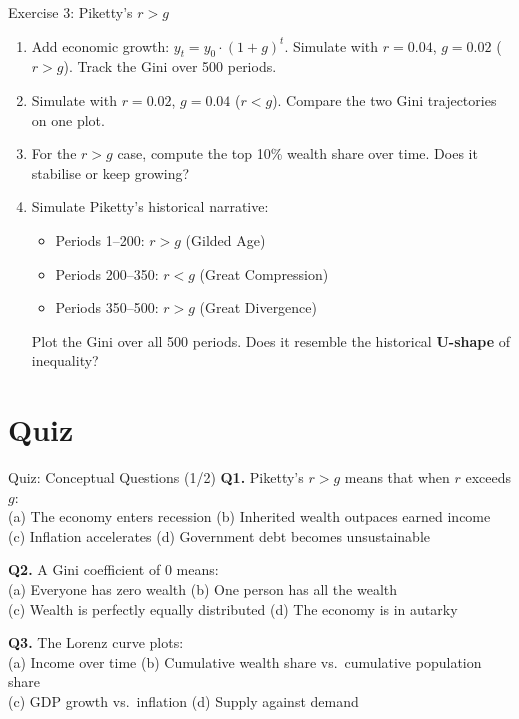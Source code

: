 \documentclass[aspectratio=169, 10pt]{beamer}
\begin{document}
\begin{frame}{Exercise 3: Piketty's $r > g$}
\begin{enumerate}
  \item[(a)] Add economic growth: $y_t = y_0 \cdot (1+g)^t$.
    Simulate with $r = 0.04$, $g = 0.02$ ($r > g$).
    Track the Gini over 500 periods.
  \item[(b)] Simulate with $r = 0.02$, $g = 0.04$ ($r < g$).
    Compare the two Gini trajectories on one plot.
  \item[(c)] For the $r > g$ case, compute the top 10\% wealth share
    over time. Does it stabilise or keep growing?
  \item[(d)] Simulate Piketty's historical narrative:
    \begin{itemize}
      \item Periods 1--200: $r > g$ (Gilded Age)
      \item Periods 200--350: $r < g$ (Great Compression)
      \item Periods 350--500: $r > g$ (Great Divergence)
    \end{itemize}
    Plot the Gini over all 500 periods. Does it resemble the
    historical \textbf{U-shape} of inequality?
\end{enumerate}
\end{frame}

\section{Quiz}

\begin{frame}{Quiz: Conceptual Questions (1/2)}
\textbf{Q1.} Piketty's $r > g$ means that when $r$ exceeds $g$: \\[3pt]
\quad (a) The economy enters recession \quad
(b) \alert{Inherited wealth outpaces earned income} \\
\quad (c) Inflation accelerates \quad
(d) Government debt becomes unsustainable
\vspace{0.8em}

\textbf{Q2.} A Gini coefficient of 0 means: \\[3pt]
\quad (a) Everyone has zero wealth \quad
(b) One person has all the wealth \\
\quad (c) \alert{Wealth is perfectly equally distributed} \quad
(d) The economy is in autarky
\vspace{0.8em}

\textbf{Q3.} The Lorenz curve plots: \\[3pt]
\quad (a) Income over time \quad
(b) \alert{Cumulative wealth share vs.\ cumulative population share} \\
\quad (c) GDP growth vs.\ inflation \quad
(d) Supply against demand
\end{frame}
\end{document}
